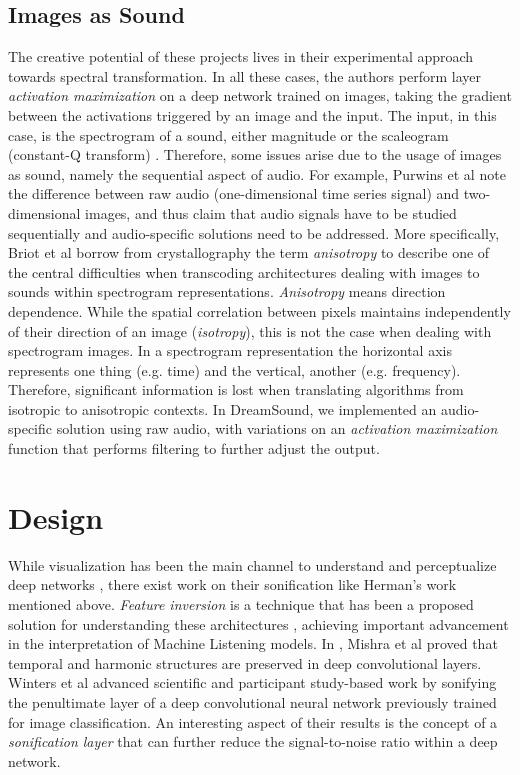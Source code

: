 \documentclass[a4paper,10pt,oneside]{article}
\begin{document}
\begin{sloppy}
\subsection{Images as Sound}
The creative potential of these projects lives in their experimental approach towards spectral transformation. In all these cases, the authors perform layer \textit{activation maximization} on a deep network trained on images, taking the gradient between the activations triggered by an image and the input. The input, in this case, is the spectrogram of a sound, either magnitude \cite{Balke2015,Stamenovic2016} or the scaleogram (constant-Q transform) \cite{pmlr-v123-herrmann20a}. Therefore, some issues arise due to the usage of images as sound, namely the sequential aspect of audio. For example, Purwins et al \cite{2019Purwins} note the difference between raw audio (one-dimensional time series signal) and two-dimensional images, and thus claim that audio signals have to be studied sequentially and audio-specific solutions need to be addressed. More specifically, Briot et al \cite{Briot2017} borrow from crystallography the term \textit{anisotropy} to describe one of the central difficulties when transcoding architectures dealing with images to sounds within spectrogram representations. \textit{Anisotropy} means direction dependence. While the spatial correlation between pixels maintains independently of their direction of an image (\textit{isotropy}), this is not the case when dealing with spectrogram images. In a spectrogram representation the horizontal axis represents one thing (e.g. time) and the vertical, another (e.g. frequency). Therefore, significant information is lost when translating algorithms from isotropic to anisotropic contexts. In DreamSound, we implemented an audio-specific solution using raw audio, with variations on an \textit{activation maximization} function that performs filtering to further adjust the output. 

\section{Design}

While visualization has been the main channel to understand and perceptualize deep networks \cite{simonyan2014deep}, there exist work on their sonification like Herman's work mentioned above. \textit{Feature inversion} is a technique that has been a proposed solution for understanding these architectures \cite{mahendran2014understanding, dosovitskiy2016inverting}, achieving important advancement in the interpretation of Machine Listening models. In \cite{saumitra_mishra_2018_1492527}, Mishra et al proved that temporal and harmonic structures are preserved in deep convolutional layers. Winters et al \cite{Winters2019} advanced scientific and participant study-based work by sonifying the penultimate layer of a deep convolutional neural network previously trained for image classification. An interesting aspect of their results is the concept of a \textit{sonification layer} that can further reduce the signal-to-noise ratio within a deep network. 


\end{sloppy}
\end{document}

